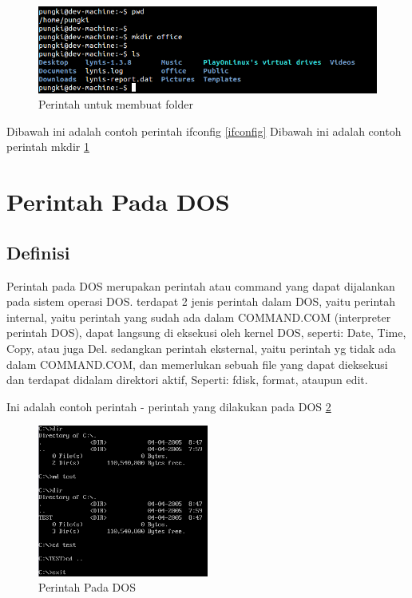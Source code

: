 			\begin{figure}[ht]
			\centerline{\includegraphics[width=1\textwidth]{figures/mkdir.png}}
			\caption{Perintah untuk membuat folder}
			\label{mkdir}
			\end{figure}
		Dibawah ini adalah contoh perintah ifconfig \ref{ifconfig}
		Dibawah ini adalah contoh perintah mkdir \ref{mkdir}
		
\pagebreak
	
	\section{Perintah Pada DOS}
		\subsection{Definisi}
		\hspace{1cm}Perintah pada DOS merupakan perintah atau command yang dapat dijalankan pada sistem operasi DOS. terdapat 2 jenis perintah dalam DOS, yaitu perintah internal, yaitu perintah yang sudah ada dalam COMMAND.COM (interpreter perintah DOS), dapat langsung di eksekusi oleh kernel DOS, seperti: Date, Time, Copy, atau juga Del. sedangkan perintah eksternal, yaitu perintah yg tidak ada dalam COMMAND.COM, dan memerlukan sebuah file yang dapat dieksekusi dan terdapat didalam direktori aktif, Seperti: fdisk, format, ataupun edit.
		
		\vspace{1cm} Ini adalah contoh perintah - perintah yang dilakukan pada DOS 
		\ref{commanddos}
		\begin{figure}[ht]
			\centerline{\includegraphics[width=0.5\textwidth]{figures/commanddos.png}}
			\caption{Perintah Pada DOS}
			\label{commanddos}
			\end{figure}
			
